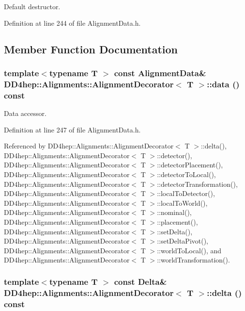 Default destructor. 

Definition at line 244 of file AlignmentData.h.

\subsection{Member Function Documentation}
\hypertarget{class_d_d4hep_1_1_alignments_1_1_alignment_decorator_aaf883c9e154e4ffbf53272eb427e09ee}{
\subsubsection[{data}]{\setlength{\rightskip}{0pt plus 5cm}template$<$typename T $>$ const {\bf AlignmentData}\& {\bf DD4hep::Alignments::AlignmentDecorator}$<$ {\bf T} $>$::data () const}}
\label{class_d_d4hep_1_1_alignments_1_1_alignment_decorator_aaf883c9e154e4ffbf53272eb427e09ee}


Data accessor. 

Definition at line 247 of file AlignmentData.h.

Referenced by DD4hep::Alignments::AlignmentDecorator$<$ T $>$::delta(), DD4hep::Alignments::AlignmentDecorator$<$ T $>$::detector(), DD4hep::Alignments::AlignmentDecorator$<$ T $>$::detectorPlacement(), DD4hep::Alignments::AlignmentDecorator$<$ T $>$::detectorToLocal(), DD4hep::Alignments::AlignmentDecorator$<$ T $>$::detectorTransformation(), DD4hep::Alignments::AlignmentDecorator$<$ T $>$::localToDetector(), DD4hep::Alignments::AlignmentDecorator$<$ T $>$::localToWorld(), DD4hep::Alignments::AlignmentDecorator$<$ T $>$::nominal(), DD4hep::Alignments::AlignmentDecorator$<$ T $>$::placement(), DD4hep::Alignments::AlignmentDecorator$<$ T $>$::setDelta(), DD4hep::Alignments::AlignmentDecorator$<$ T $>$::setDeltaPivot(), DD4hep::Alignments::AlignmentDecorator$<$ T $>$::worldToLocal(), and DD4hep::Alignments::AlignmentDecorator$<$ T $>$::worldTransformation().\hypertarget{class_d_d4hep_1_1_alignments_1_1_alignment_decorator_a605b90653ed0edd0bda77c8e63e93e53}{
\subsubsection[{delta}]{\setlength{\rightskip}{0pt plus 5cm}template$<$typename T $>$ const {\bf Delta}\& {\bf DD4hep::Alignments::AlignmentDecorator}$<$ {\bf T} $>$::delta () const}}
\label{class_d_d4hep_1_1_alignments_1_1_alignment_decorator_a605b90653ed0edd0bda77c8e63e93e53}


